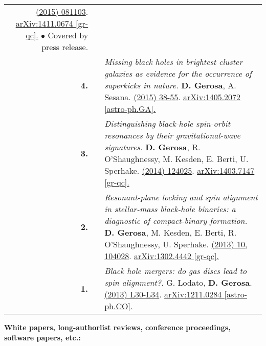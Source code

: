 {\begin{longtable}{rp{0.3cm}p{15.8cm}}
\href{http://dx.doi.org/10.1103/PhysRevLett.114.081103}{\prl 114 (2015) 081103}. \href{https://arxiv.org/abs/1411.0674}{arXiv:1411.0674 [gr-qc].}
\newline{}
\textcolor{color1}{$\bullet$} Covered by press release.
\vspace{0.09cm}\\
%
\textbf{4.} & & \textit{Missing black holes in brightest cluster galaxies as evidence for the occurrence of superkicks in nature.}
\newline{}
\textbf{D. Gerosa}, A. Sesana.
\newline{}
\href{http://dx.doi.org/10.1093/mnras/stu2049}{\mnras 446 (2015) 38-55}. \href{https://arxiv.org/abs/1405.2072}{arXiv:1405.2072 [astro-ph.GA].}
\vspace{0.09cm}\\
%
\textbf{3.} & & \textit{Distinguishing black-hole spin-orbit resonances by their gravitational-wave signatures.}
\newline{}
\textbf{D. Gerosa}, R. O'Shaughnessy, M. Kesden, E. Berti, U. Sperhake.
\newline{}
\href{http://dx.doi.org/10.1103/PhysRevD.89.124025}{\prd 89 (2014) 124025}. \href{https://arxiv.org/abs/1403.7147}{arXiv:1403.7147 [gr-qc].}
\vspace{0.09cm}\\
%
\textbf{2.} & & \textit{Resonant-plane locking and spin alignment in stellar-mass black-hole binaries: a diagnostic of compact-binary formation.}
\newline{}
\textbf{D. Gerosa}, M. Kesden, E. Berti, R. O'Shaughnessy, U. Sperhake.
\newline{}
\href{http://dx.doi.org/10.1103/PhysRevD.87.104028}{\prd 87 (2013) 10, 104028}. \href{https://arxiv.org/abs/1302.4442}{arXiv:1302.4442 [gr-qc].}
\vspace{0.09cm}\\
%
\textbf{1.} & & \textit{Black hole mergers: do gas discs lead to spin alignment?.}
\newline{}
G. Lodato, \textbf{D. Gerosa}.
\newline{}
\href{http://dx.doi.org/10.1093/mnrasl/sls018}{\mnrasl 429 (2013) L30-L34}. \href{https://arxiv.org/abs/1211.0284}{arXiv:1211.0284 [astro-ph.CO].}
\vspace{0.09cm}\\
%
\end{longtable} }
\textcolor{color1}{\textbf{White papers, long-authorlist reviews, conference proceedings, software papers, etc.:}}
\vspace{-0.5cm}

